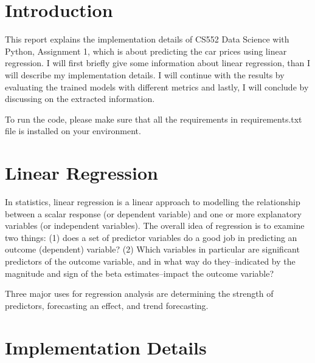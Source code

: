 \section*{Introduction}

This report explains the implementation details of CS552 Data Science with
Python, Assignment 1, which is about predicting the car prices using linear
regression. I will first briefly give some information about linear regression,
than I will describe my implementation details. I will continue with the results
by evaluating the trained models with different metrics and lastly, I will
conclude by discussing on the extracted information.

To run the code, please make sure that all the requirements in requirements.txt file is
installed on your environment.
\section*{Linear Regression}

In statistics, linear regression is a linear approach to modelling the
relationship between a scalar response (or dependent variable) and one or more
explanatory variables (or independent variables). The overall idea of regression
is to examine two things: (1) does a set of predictor variables do a good job
in predicting an outcome (dependent) variable?  (2) Which variables in
particular are significant predictors of the outcome variable, and in what way
do they–indicated by the magnitude and sign of the beta estimates–impact the
outcome variable?

Three major uses for regression analysis are determining the strength of
predictors, forecasting an effect, and trend forecasting.




\section*{Implementation Details}
